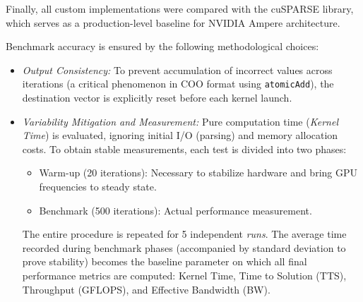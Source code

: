 \documentclass[conference]{IEEEtran}
\begin{document}
Finally, all custom implementations were compared with the cuSPARSE library, which serves as a production-level baseline for NVIDIA Ampere architecture.

Benchmark accuracy is ensured by the following methodological choices:


\begin{itemize}

    \item \textit{Output Consistency:} To prevent accumulation of incorrect values across iterations (a critical phenomenon in COO format using \texttt{atomicAdd}), the destination vector is explicitly reset before each kernel launch.

    

    \item \textit{Variability Mitigation and Measurement:} Pure computation time (\textit{Kernel Time}) is evaluated, ignoring initial I/O (parsing) and memory allocation costs. To obtain stable measurements, each test is divided into two phases:

    \begin{itemize}

        \item Warm-up (20 iterations): Necessary to stabilize hardware and bring GPU frequencies to steady state.

        \item Benchmark (500 iterations): Actual performance measurement.

    \end{itemize}

    The entire procedure is repeated for 5 independent \textit{runs}. The average time recorded during benchmark phases (accompanied by standard deviation to prove stability) becomes the baseline parameter on which all final performance metrics are computed: Kernel Time, Time to Solution (TTS), Throughput (GFLOPS), and Effective Bandwidth (BW).

\end{itemize}
\end{document}
